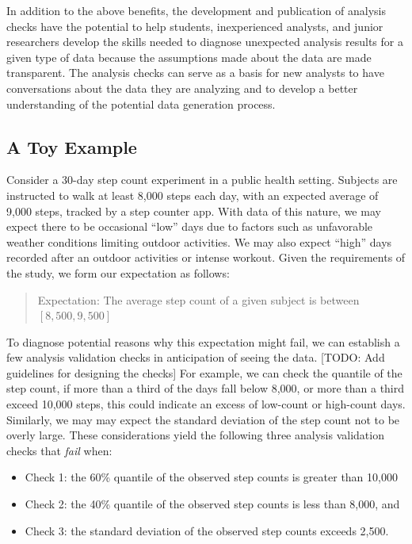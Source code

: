 \documentclass[
  12pt,
]{interact}
\providecommand{\tightlist}{%
  \setlength{\itemsep}{0pt}\setlength{\parskip}{0pt}}\usepackage{longtable,booktabs,array}
\begin{document}
In addition to the above benefits, the development and publication of
analysis checks have the potential to help students, inexperienced
analysts, and junior researchers develop the skills needed to diagnose
unexpected analysis results for a given type of data because the
assumptions made about the data are made transparent. The analysis
checks can serve as a basis for new analysts to have conversations about
the data they are analyzing and to develop a better understanding of the
potential data generation process.

\subsection{A Toy Example}\label{sec-toy}

Consider a 30-day step count experiment in a public health setting.
Subjects are instructed to walk at least 8,000 steps each day, with an
expected average of 9,000 steps, tracked by a step counter app. With
data of this nature, we may expect there to be occasional ``low'' days
due to factors such as unfavorable weather conditions limiting outdoor
activities. We may also expect ``high'' days recorded after an outdoor
activities or intense workout. Given the requirements of the study, we
form our expectation as follows:

\begin{quote}
Expectation: The average step count of a given subject is between
\([8,500, 9,500]\)
\end{quote}

To diagnose potential reasons why this expectation might fail, we can
establish a few analysis validation checks in anticipation of seeing the
data. {[}TODO: Add guidelines for designing the checks{]} For example,
we can check the quantile of the step count, if more than a third of the
days fall below 8,000, or more than a third exceed 10,000 steps, this
could indicate an excess of low-count or high-count days. Similarly, we
may may expect the standard deviation of the step count not to be overly
large. These considerations yield the following three analysis
validation checks that \emph{fail} when:

\begin{itemize}
\tightlist
\item
  Check 1: the 60\% quantile of the observed step counts is greater than
  10,000
\item
  Check 2: the 40\% quantile of the observed step counts is less than
  8,000, and
\item
  Check 3: the standard deviation of the observed step counts exceeds
  2,500.
\end{itemize}
\end{document}
